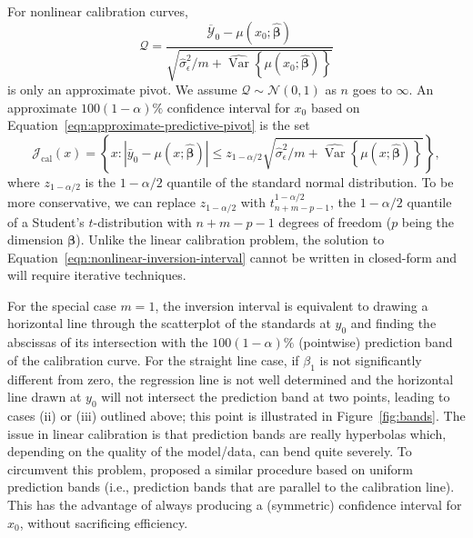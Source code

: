 \documentclass[cmfont,usenames,dvipsnames,leqno]{afit-etd}\usepackage[]{graphicx}\usepackage[]{color}
\newcommand{\mc}[1]{\ensuremath{\mathcal{#1}}}
\newcommand{\wh}[1]{\ensuremath{\widehat{#1}}}
\newcommand{\wb}[1]{\ensuremath{\overline{#1}}}
\newcommand{\var}{\operatorname{Var}}
\begin{document}
For nonlinear calibration curves, 
\begin{equation}
\label{eqn:approximate-predictive-pivot}
  \mc{Q} = \frac{\wb{\mc{Y}}_0 - \mu\left(x_0; \wh{\bm{\beta}}\right)}{\sqrt{\wh{\sigma}_\epsilon^2/m + \wh{\var}\left\{\mu\left(x_0; \wh{\bm{\beta}}\right)\right\}}}
\end{equation}
is only an approximate pivot. We assume $\mc{Q} \sim \mc{N}(0, 1)$ as $n$ goes to $\infty$. An approximate $100(1 - \alpha)\%$ confidence interval for $x_0$ based on Equation~\eqref{eqn:approximate-predictive-pivot} is the set 
\begin{equation}
\label{eqn:nonlinear-inversion-interval}
  \mc{J}_\mathrm{cal}(x) = \left\{x: \left|\bar{y}_0 - \mu\left(x; \wh{\bm{\beta}}\right)\right| \le z_{1-\alpha/2} \sqrt{\wh{\sigma}_\epsilon^2/m + \wh{\var}\left\{\mu\left(x; \wh{\bm{\beta}}\right)\right\}}\right\},
\end{equation}
where $z_{1-\alpha/2}$ is the $1 - \alpha/2$ quantile of the standard normal distribution. To be more conservative, we can replace $z_{1-\alpha/2}$ with $t_{n+m-p-1}^{1-\alpha/2}$, the $1-\alpha/2$ quantile of a Student's $t$-distribution with $n+m-p-1$ degrees of freedom ($p$ being the dimension $\bm{\beta}$). Unlike the linear calibration problem, the solution to Equation~\eqref{eqn:nonlinear-inversion-interval} cannot be written in closed-form and will require iterative techniques. 

For the special case $m = 1$, the inversion interval is equivalent to drawing a horizontal line through the scatterplot of the standards at $y_0$ and finding the abscissas of its intersection with the $100(1-\alpha)\%$ (pointwise) prediction band of the calibration curve. For the straight line case, if $\beta_1$ is not significantly different from zero, the regression line is not well determined and the horizontal line drawn at $y_0$ will not intersect the prediction band at two points, leading to cases (ii) or (iii) outlined above; this point is illustrated in Figure~\ref{fig:bands}. The issue in linear calibration is that prediction bands are really hyperbolas which, depending on the quality of the model/data, can bend quite severely. To circumvent this problem, \citet{trout_regular_1979} proposed a similar procedure based on uniform prediction bands (i.e., prediction bands that are parallel to the calibration line). This has the advantage of always producing a (symmetric) confidence interval for $x_0$, without sacrificing efficiency. 
\end{document}
